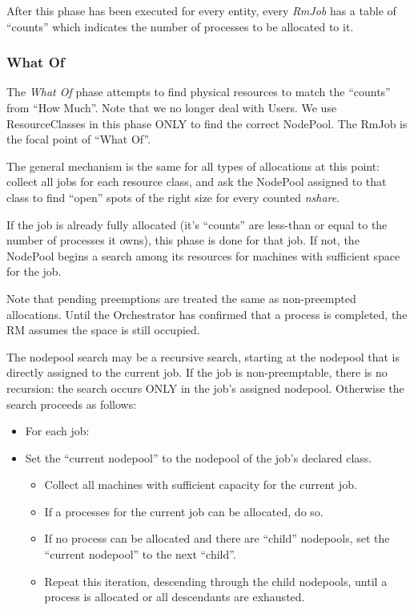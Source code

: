       After this phase has been executed for every entity, every {\em RmJob} has a table of
      ``counts'' which indicates the number of processes to be allocated to it.

\subsubsection{What Of}

  The {\em What Of} phase attempts to find physical resources to match the ``counts'' from ``How Much''.  Note
  that we no longer deal with Users.  We use ResourceClasses in this phase ONLY to find the correct
  NodePool.  The RmJob is the focal point of ``What Of''.
  
  The general mechanism is the same for all types of allocations at this point: collect all jobs
  for each resource class, and ask the NodePool assigned to that class to find ``open'' spots
  of the right size for every counted {\em nshare}.

  If the job is already fully allocated (it's ``counts'' are less-than or equal to the number of
  processes it owns), this phase is done for that job.  If not, the NodePool begins a search
  among its resources for machines with sufficient space for the job.

  Note that pending preemptions are treated the same as non-preempted allocations.  Until the Orchestrator
  has confirmed that a process is completed, the RM assumes the space is still occupied.

  The nodepool search may be a recursive search, starting at the nodepool that is directly assigned to the
  current job.  If the job is non-preemptable, there is no recursion: the search occurs ONLY in the job's assigned nodepool.  Otherwise
  the search proceeds as follows:
  
  \begin{itemize}
    \item For each job:
      \item Set the ``current nodepool'' to the nodepool of the job's declared class.
        \begin{itemize}
        \item Collect all machines with sufficient capacity for the current job.
        \item If a processes for the current job can be allocated, do so.
        \item If no process can be allocated and there are ``child'' nodepools, set the
          ``current nodepool'' to the next ``child''.
        \item Repeat this iteration, descending through the child nodepools, until
          a process is allocated or all descendants are exhausted.
     \end{itemize}
  \end{itemize}
  
